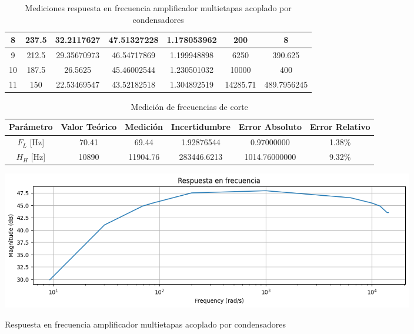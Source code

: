 \begin{table}[h!]
\begin{tabular}{|c|c|c|c|c|c|c|}
8 & 237.5 & 32.2117627 & 47.51327228 & 1.178053962 & 200 & 8 \\ \hline
9 & 212.5 & 29.35670973 & 46.54717869 & 1.199948898 & 6250 & 390.625 \\ \hline
10 & 187.5 & 26.5625 & 45.46002544 & 1.230501032 & 10000 & 400 \\ \hline
11 & 150 & 22.53469547 & 43.52182518 & 1.304892519 & 14285.71 & 489.7956245 \\ \hline
\end{tabular}
\caption{Mediciones respuesta en frecuencia amplificador multietapas acoplado por condensadores}
\label{tab:med-respuesta-frecuencia-amplificador-multietapas-acoplado-condensadores}
\end{table}

\begin{table}[h!]
\centering
\begin{tabular}{|c|c|c|c|c|c|}
\hline
\textbf{Parámetro} & \textbf{Valor Teórico} & \textbf{Medición} & \textbf{Incertidumbre} & \textbf{Error Absoluto} & \textbf{Error Relativo} \\ \hline
$F_L$ [Hz] & 70.41 & 69.44 & 1.92876544 & 0.97000000 & 1.38\% \\ \hline
$H_H$ [Hz] & 10890 & 11904.76 & 283446.6213 & 1014.76000000 & 9.32\% \\ \hline
\end{tabular}
\caption{Medición de frecuencias de corte}
\label{tab:med-frecuencias-corte}
\end{table}


\begin{ilustracion}[ht]
    \centering
    \includegraphics[width=0.8\textwidth]{src/images/resultados/p4/respuesta en frecuencia practica 4 con condensadores.png}
    \caption{Respuesta en frecuencia amplificador multietapas acoplado por condensadores}
    \label{ilus:respuesta-frecuencia-amplificador-multietapas-acoplado-condensadores}
\end{ilustracion}

